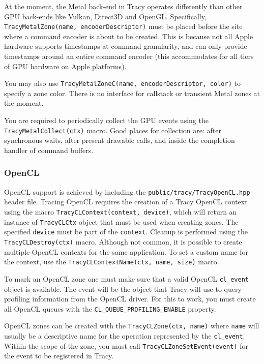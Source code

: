 \documentclass[hidelinks,titlepage,a4paper,twoside]{article}
\begin{document}
At the moment, the Metal back-end in Tracy operates differently than other GPU back-ends like Vulkan, Direct3D and OpenGL. Specifically, \texttt{TracyMetalZone(name, encoderDescriptor)} must be placed before the site where a command encoder is about to be created. This is because not all Apple hardware supports timestamps at command granularity, and can only provide timestamps around an entire command encoder (this accommodates for all tiers of GPU hardware on Apple platforms).

You may also use \texttt{TracyMetalZoneC(name, encoderDescriptor, color)} to specify a zone color. There is no interface for callstack or transient Metal zones at the moment.

You are required to periodically collect the GPU events using the \texttt{TracyMetalCollect(ctx)} macro. Good places for collection are: after synchronous waits, after present drawable calls, and inside the completion handler of command buffers.

\subsubsection{OpenCL}

OpenCL support is achieved by including the \texttt{public/tracy/TracyOpenCL.hpp} header file. Tracing OpenCL requires the creation of a Tracy OpenCL context using the macro \texttt{TracyCLContext(context, device)}, which will return an instance of \texttt{TracyCLCtx} object that must be used when creating zones. The specified \texttt{device} must be part of the \texttt{context}. Cleanup is performed using the \texttt{TracyCLDestroy(ctx)} macro. Although not common, it is possible to create multiple OpenCL contexts for the same application. To set a custom name for the context, use the \texttt{TracyCLContextName(ctx, name, size)} macro.

To mark an OpenCL zone one must make sure that a valid OpenCL \texttt{cl\_event} object is available. The event will be the object that Tracy will use to query profiling information from the OpenCL driver. For this to work, you must create all OpenCL queues with the \texttt{CL\_QUEUE\_PROFILING\_ENABLE} property.

OpenCL zones can be created with the \texttt{TracyCLZone(ctx, name)} where \texttt{name} will usually be a descriptive name for the operation represented by the \texttt{cl\_event}. Within the scope of the zone, you must call \texttt{TracyCLZoneSetEvent(event)} for the event to be registered in Tracy.
\end{document}
